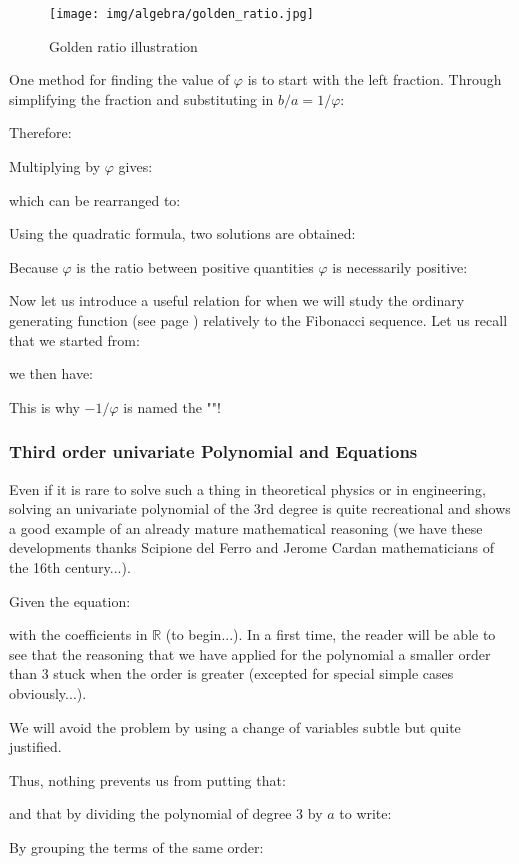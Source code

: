 	\begin{figure}[H]
		\centering
		\texttt{[image: img/algebra/golden\_ratio.jpg]}
		\caption{Golden ratio illustration}
	\end{figure}
	One method for finding the value of $\varphi$ is to start with the left fraction. Through simplifying the fraction and substituting in $b/a = 1/\varphi$:
	
	Therefore:
	
	Multiplying by $\varphi$ gives:
	
	which can be rearranged to:
	
	Using the quadratic formula, two solutions are obtained:
	
	Because $\varphi$ is the ratio between positive quantities $\varphi$ is necessarily positive:
	
	Now let us introduce a useful relation for when we will study the ordinary generating function (see page \pageref{ordinary generating function}) relatively to the Fibonacci sequence. Let us recall that we started from:
	
	we then have:
	
	This is why $-1/\varphi$ is named the ""!
	
	
	\subsubsection{Third order univariate Polynomial and Equations}
	Even if it is rare to solve such a thing in theoretical physics or in engineering, solving an univariate polynomial of the $3$rd degree is quite recreational and shows a good example of an already mature mathematical reasoning (we have these developments thanks Scipione del Ferro and Jerome Cardan mathematicians of the 16th century...).
	
	Given the equation:
	
	with the coefficients in $\mathbb{R}$ (to begin...). In a first time, the reader will be able to see that the reasoning that we have applied for the polynomial a smaller order than $3$ stuck when the order is greater (excepted for special simple cases obviously...).

	We will avoid the problem by using a change of variables subtle but quite justified.
	
	Thus, nothing prevents us from putting that:
	
	and that by dividing the polynomial of degree 3 by $a$ to write:
	
	By grouping the terms of the same order:
	
